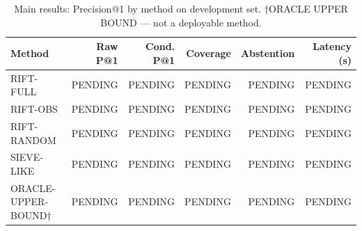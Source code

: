 \begin{table}[t]
  \centering
  \caption{Main results: Precision@1 by method on development set. †ORACLE UPPER BOUND — not a deployable method.}
  \begin{tabular}{lrrrrr}
    \hline
    Method & Raw P@1 & Cond. P@1 & Coverage & Abstention & Latency (s) \\
    \hline
    RIFT-FULL & PENDING & PENDING & PENDING & PENDING & PENDING \\
    RIFT-OBS & PENDING & PENDING & PENDING & PENDING & PENDING \\
    RIFT-RANDOM & PENDING & PENDING & PENDING & PENDING & PENDING \\
    SIEVE-LIKE & PENDING & PENDING & PENDING & PENDING & PENDING \\
    ORACLE-UPPER-BOUND† & PENDING & PENDING & PENDING & PENDING & PENDING \\
    \hline
  \end{tabular}
\end{table}
